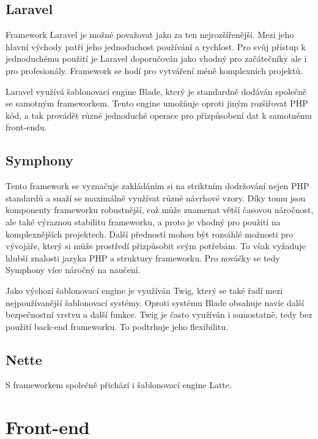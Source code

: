 \documentclass[czech,BP]{thesiskiv}
\begin{document}
\subsection{Laravel}
	\par Framework Laravel je možné považovat jako za ten nejrozšířenější. Mezi jeho hlavní východy patří jeho jednoduchost používání a rychlost. Pro svůj přístup k jednoduchému použití je Laravel doporučován jako vhodný pro začátečníky ale i pro profesionály. Framework se hodí pro vytváření méně komplexních projektů.
	\par Laravel využívá šablonovací engine Blade, který je standardně dodáván společně se samotným frameworkem. Tento engine umožňuje oproti jiným rozšiřovat PHP kód, a tak provádět různé jednoduché operace pro přizpůsobení dat k samotnému front-endu.
\subsection{Symphony}
	\par Tento framework se vyznačuje zakládáním si na striktním dodržování nejen PHP standardů a snaží se maximálně využívat různé návrhové vzory. Díky tomu jsou komponenty frameworku robustnější, což může znamenat větší časovou náročnost, ale také výraznou stabilitu frameworku, a proto je vhodný pro použití na komplexnějších projektech. Další předností mohou být rozsáhlé možnosti pro vývojáře, který si může prostředí přizpůsobit svým potřebám. To však vyžaduje hlubší znalosti jazyka PHP a struktury frameworku. Pro nováčky se tedy Symphony více náročný na naučení.
	\par Jako výchozí šablonovací engine je využíván Twig, který se také řadí mezi nejpoužívanější šablonovací systémy. Oproti systému Blade obsahuje navíc další bezpečnostní vrstvu a další funkce. Twig je často využíván i samostatně, tedy bez použití back-end frameworku. To podtrhuje jeho flexibilitu.
\subsection{Nette}
	\par 
	\par S frameworkem společně přichází i šablonovací engine Latte.
\section{Front-end}
\end{document}

